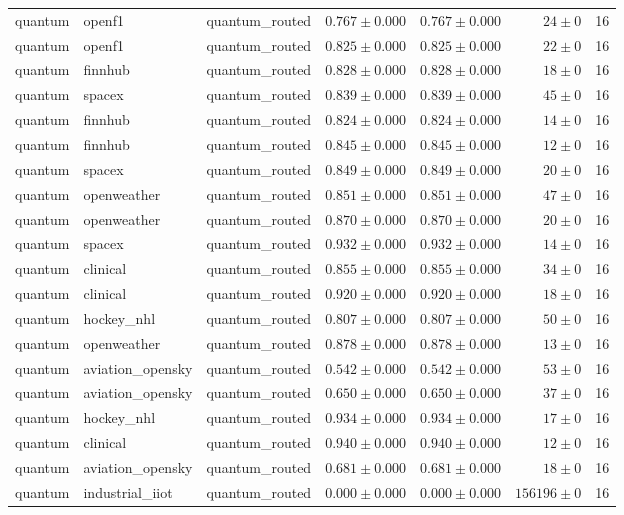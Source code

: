 \begin{table}[htbp]
\begin{tabular}{l l l r r r r}
quantum & openf1 & quantum\_routed & $0.767\pm0.000$ & $0.767\pm0.000$ & $24\pm0$ & 16 \\
quantum & openf1 & quantum\_routed & $0.825\pm0.000$ & $0.825\pm0.000$ & $22\pm0$ & 16 \\
quantum & finnhub & quantum\_routed & $0.828\pm0.000$ & $0.828\pm0.000$ & $18\pm0$ & 16 \\
quantum & spacex & quantum\_routed & $0.839\pm0.000$ & $0.839\pm0.000$ & $45\pm0$ & 16 \\
quantum & finnhub & quantum\_routed & $0.824\pm0.000$ & $0.824\pm0.000$ & $14\pm0$ & 16 \\
quantum & finnhub & quantum\_routed & $0.845\pm0.000$ & $0.845\pm0.000$ & $12\pm0$ & 16 \\
quantum & spacex & quantum\_routed & $0.849\pm0.000$ & $0.849\pm0.000$ & $20\pm0$ & 16 \\
quantum & openweather & quantum\_routed & $0.851\pm0.000$ & $0.851\pm0.000$ & $47\pm0$ & 16 \\
quantum & openweather & quantum\_routed & $0.870\pm0.000$ & $0.870\pm0.000$ & $20\pm0$ & 16 \\
quantum & spacex & quantum\_routed & $0.932\pm0.000$ & $0.932\pm0.000$ & $14\pm0$ & 16 \\
quantum & clinical & quantum\_routed & $0.855\pm0.000$ & $0.855\pm0.000$ & $34\pm0$ & 16 \\
quantum & clinical & quantum\_routed & $0.920\pm0.000$ & $0.920\pm0.000$ & $18\pm0$ & 16 \\
quantum & hockey\_nhl & quantum\_routed & $0.807\pm0.000$ & $0.807\pm0.000$ & $50\pm0$ & 16 \\
quantum & openweather & quantum\_routed & $0.878\pm0.000$ & $0.878\pm0.000$ & $13\pm0$ & 16 \\
quantum & aviation\_opensky & quantum\_routed & $0.542\pm0.000$ & $0.542\pm0.000$ & $53\pm0$ & 16 \\
quantum & aviation\_opensky & quantum\_routed & $0.650\pm0.000$ & $0.650\pm0.000$ & $37\pm0$ & 16 \\
quantum & hockey\_nhl & quantum\_routed & $0.934\pm0.000$ & $0.934\pm0.000$ & $17\pm0$ & 16 \\
quantum & clinical & quantum\_routed & $0.940\pm0.000$ & $0.940\pm0.000$ & $12\pm0$ & 16 \\
quantum & aviation\_opensky & quantum\_routed & $0.681\pm0.000$ & $0.681\pm0.000$ & $18\pm0$ & 16 \\
quantum & industrial\_iiot & quantum\_routed & $0.000\pm0.000$ & $0.000\pm0.000$ & $156196\pm0$ & 16 \\

\end{tabular}
\end{table}
